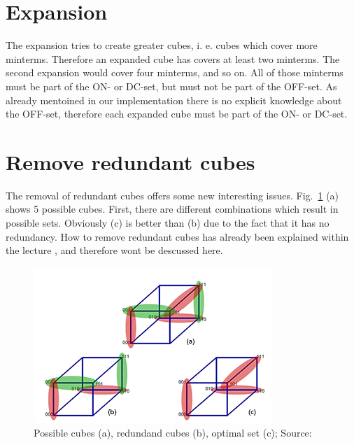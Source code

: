 \documentclass[colorback,accentcolor=tud1c,11pt]{tudreport}
\begin{document}
 \section{Expansion}
 The expansion tries to create greater cubes, i. e. cubes which cover more minterms. Therefore an expanded cube has covers at least two minterms. The second expansion would cover four minterms, and so on. All of those minterms must be part of the ON- or DC-set, but must not be part of the OFF-set. As already mentoined in our implementation there is no explicit knowledge about the OFF-set, therefore each expanded cube must be part of the ON- or DC-set.

 \section{Remove redundant cubes}
 The removal of redundant cubes offers some new interesting issues. Fig.~\ref{fig:redundancy} (a) shows 5 possible cubes. First, there are different combinations which result in possible sets. Obviously (c) is better than (b) due to the fact that it has no redundancy. How to remove redundant cubes has already been explained within the lecture \cite{Hochberger2017}, and therefore wont be descussed here.
 \begin{figure}
   \centering
   \includegraphics{redundancy}
   \caption{Possible cubes (a), redundand cubes (b), optimal set (c); Source: \cite{Hochberger2017}}
   \label{fig:redundancy}
 \end{figure}
\end{document}
